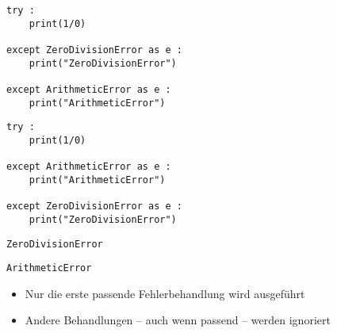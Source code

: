 \begin{frame}[fragile]
%
\begin{tcbraster}[raster columns=2,
                  raster equal height,
                  nobeforeafter,
                  raster column skip=0.5cm]
\begin{codebox}
\begin{verbatim}
try :
    print(1/0)
    
except ZeroDivisionError as e :
    print("ZeroDivisionError")
    
except ArithmeticError as e :
    print("ArithmeticError")
\end{verbatim}
\end{codebox}
%
\begin{codebox}
\begin{verbatim}
try :
    print(1/0)
    
except ArithmeticError as e :
    print("ArithmeticError")
    
except ZeroDivisionError as e :
    print("ZeroDivisionError")
\end{verbatim}
\end{codebox}
\end{tcbraster}
%
\begin{tcbraster}[raster columns=2,
                  raster equal height,
                  nobeforeafter,
                  raster column skip=0.5cm]
\begin{cmdbox}
\begin{verbatim}
ZeroDivisionError
\end{verbatim}
\end{cmdbox}
%
\begin{cmdbox}
\begin{verbatim}
ArithmeticError
\end{verbatim}
\end{cmdbox}
\end{tcbraster}
%
\begin{itemize}
\item[\Thus] Nur die erste passende Fehlerbehandlung wird ausgeführt
\item[\Thus] Andere Behandlungen -- auch wenn passend -- werden ignoriert
\end{itemize}
%
\end{frame}

